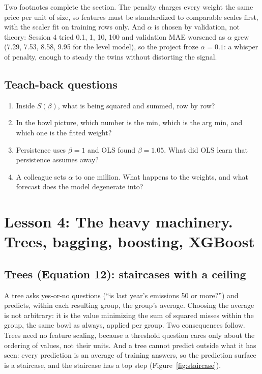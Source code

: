 \documentclass[11pt]{article}
\begin{document}
Two footnotes complete the section. The penalty charges every weight the
same price per unit of size, so features must be standardized to
comparable scales first, with the scaler fit on training rows only.
And $\alpha$ is chosen by validation, not theory: Session 4 tried 0.1, 1,
10, 100 and validation MAE worsened as $\alpha$ grew (7.29, 7.53, 8.58,
9.95 for the level model), so the project froze $\alpha = 0.1$: a whisper
of penalty, enough to steady the twins without distorting the signal.

\subsection{Teach-back questions}

\begin{enumerate}
\item Inside $S(\beta)$, what is being squared and summed, row by row?
\item In the bowl picture, which number is the min, which is the arg min,
and which one is the fitted weight?
\item Persistence uses $\beta = 1$ and OLS found $\beta = 1.05$. What did
OLS learn that persistence assumes away?
\item A colleague sets $\alpha$ to one million. What happens to the
weights, and what forecast does the model degenerate into?
\end{enumerate}

\section{Lesson 4: The heavy machinery. Trees, bagging, boosting, XGBoost}

\subsection{Trees (Equation 12): staircases with a ceiling}

A tree asks yes-or-no questions (``is last year's emissions 50 or
more?'') and predicts, within each resulting group, the group's average.
Choosing the average is not arbitrary: it is the value minimizing the sum
of squared misses within the group, the same bowl as always, applied per
group. Two consequences follow. Trees need no feature scaling, because a
threshold question cares only about the ordering of values, not their
units. And a tree cannot predict outside what it has seen: every
prediction is an average of training answers, so the prediction surface
is a staircase, and the staircase has a top step
(Figure~\ref{fig:staircase}).
\end{document}
